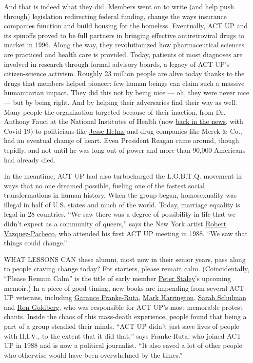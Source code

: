 And that is indeed what they did. Members went on to write (and help
push through) legislation redirecting federal funding, change the ways
insurance companies function and build housing for the homeless.
Eventually, ACT UP and its spinoffs proved to be full partners in
bringing effective antiretroviral drugs to market in 1996. Along the
way, they revolutionized how pharmaceutical sciences are practiced and
health care is provided. Today, patients of most diagnoses are involved
in research through formal advisory boards, a legacy of ACT UP's
citizen-science activism. Roughly 23 million people are alive today
thanks to the drugs that members helped pioneer; few human beings can
claim such a massive humanitarian impact. They did this not by being
nice --- oh, they were never nice --- but by being right. And by helping
their adversaries find their way as well. Many people the organization
targeted because of their inaction, from Dr. Anthony Fauci at the
National Institutes of Health (now
\href{https://www.nytimes.com/2020/03/28/technology/coronavirus-fauci-trump-conspiracy-target.html}{back
in the news}, with Covid-19) to politicians like
\href{https://www.nytimes.com/topic/person/jesse-helms}{Jesse Helms} and
drug companies like Merck \& Co., had an eventual change of heart. Even
President Reagan came around, though tepidly, and not until he was long
out of power and more than 90,000 Americans had already died.

In the meantime, ACT UP had also turbocharged the L.G.B.T.Q. movement in
ways that no one dreamed possible, fueling one of the fastest social
transformations in human history. When the group began, homosexuality
was illegal in half of U.S. states and much of the world. Today,
marriage equality is legal in 28 countries. ``We saw there was a degree
of possibility in life that we didn't expect as a community of queers,''
says the New York artist
\href{http://www.actuporalhistory.org/interviews/video/vazquez.html}{Robert
Vazquez-Pacheco}, who attended his first ACT UP meeting in 1988. ``We
saw that things could change.''

WHAT LESSONS CAN these alumni, most now in their senior years, pass
along to people craving change today? For starters, please remain calm.
(Coincidentally, ``Please Remain Calm'' is the title of early member
\href{https://www.nytimes.com/2019/03/21/podcasts/the-daily/hiv-aids-cure.html}{Peter
Staley}'s upcoming memoir.) In a piece of good timing, new books are
impending from several ACT UP veterans, including
\href{https://twitter.com/thegarance}{Garance Franke-Ruta},
\href{https://www.treatmentactiongroup.org/about-us/staff/mark-harrington/}{Mark
Harrington},
\href{https://www.nytimes.com/2018/04/16/t-magazine/1980s-protest-movements.html}{Sarah
Schulman} and \href{https://c4aa.org/2016/04/ron-goldberg}{Ron
Goldberg}, who was responsible for ACT UP's most memorable protest
chants. Inside the chaos of this mass-death experience, people found
that being a part of a group steadied their minds. ``ACT UP didn't just
save lives of people with H.I.V., to the extent that it did that,'' says
Franke-Ruta, who joined ACT UP in 1988 and is now a political
journalist. ``It also saved a lot of other people who otherwise would
have been overwhelmed by the times.''

